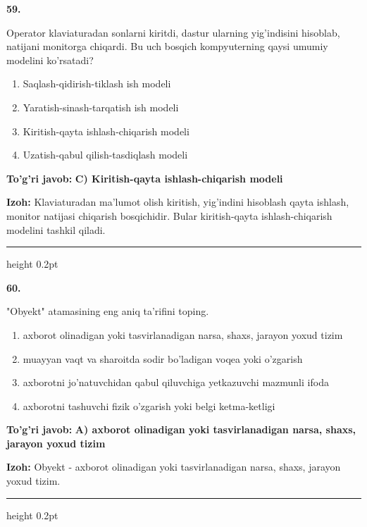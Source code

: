\documentclass[10pt,a4paper,oneside]{article}
\begin{document}
\noindent\textbf{\color{ink}59.}
\par
Operator klaviaturadan sonlarni kiritdi, dastur ularning yig'indisini hisoblab, natijani monitorga chiqardi. Bu uch bosqich kompyuterning qaysi umumiy modelini ko'rsatadi?
\begin{enumerate}[label=\Alph*),leftmargin=9mm]
\item Saqlash-qidirish-tiklash ish modeli
\item Yaratish-sinash-tarqatish ish modeli
\item Kiritish-qayta ishlash-chiqarish modeli
\item Uzatish-qabul qilish-tasdiqlash modeli
\end{enumerate}
\begin{tcolorbox}[enhanced,breakable,colback=teal!4,colframe=teal!50!black,boxrule=0.5pt,arc=1.1mm,left=3mm,right=3mm,top=1.7mm,bottom=1.7mm,before skip=2mm,after skip=2mm]
\textbf{\color{teal}To'g'ri javob:} \textbf{C) Kiritish-qayta ishlash-chiqarish modeli}
\par\smallskip
\textbf{Izoh:} Klaviaturadan ma'lumot olish kiritish, yig'indini hisoblash qayta ishlash, monitor natijasi chiqarish bosqichidir. Bular kiritish-qayta ishlash-chiqarish modelini tashkil qiladi.
\end{tcolorbox}
\vspace{2mm}\hrule height 0.2pt \vspace{3mm}

\noindent\textbf{\color{ink}60.}
\par
"Obyekt" atamasining eng aniq ta'rifini toping.
\begin{enumerate}[label=\Alph*),leftmargin=9mm]
\item axborot olinadigan yoki tasvirlanadigan narsa, shaxs, jarayon yoxud tizim
\item muayyan vaqt va sharoitda sodir bo'ladigan voqea yoki o'zgarish
\item axborotni jo'natuvchidan qabul qiluvchiga yetkazuvchi mazmunli ifoda
\item axborotni tashuvchi fizik o'zgarish yoki belgi ketma-ketligi
\end{enumerate}
\begin{tcolorbox}[enhanced,breakable,colback=teal!4,colframe=teal!50!black,boxrule=0.5pt,arc=1.1mm,left=3mm,right=3mm,top=1.7mm,bottom=1.7mm,before skip=2mm,after skip=2mm]
\textbf{\color{teal}To'g'ri javob:} \textbf{A) axborot olinadigan yoki tasvirlanadigan narsa, shaxs, jarayon yoxud tizim}
\par\smallskip
\textbf{Izoh:} Obyekt - axborot olinadigan yoki tasvirlanadigan narsa, shaxs, jarayon yoxud tizim.
\end{tcolorbox}
\vspace{2mm}\hrule height 0.2pt \vspace{3mm}
\end{document}
